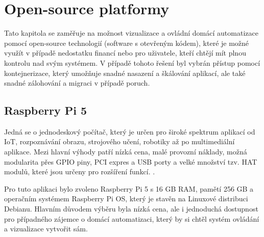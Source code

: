 \chapter{Open-source platformy}
Tato kapitola se zaměřuje na možnost vizualizace a ovládní domácí automatizace pomocí open-source technologií (software s otevřeným kódem), které je možné využít v případě nedostatku financí nebo pro uživatele, kteří chtějí mít plnou kontrolu nad svým systémem. V případě tohoto řešení byl vybrán přístup pomocí kontejnerizace, který umožňuje snadné nasazení a škálování aplikací, ale také snadné zálohování a migraci v případě poruch.

\section{Raspberry Pi 5}
Jedná se o jednodeskový počítač, který je určen pro široké spektrum aplikací od IoT, rozpoznávání obrazu, strojového učení, robotiky až po multimediální aplikace. Mezi hlavní výhody patří nízká cena, malé provozní náklady, možná modularita přes GPIO piny, PCI expres a USB porty a velké množství tzv. HAT modulů, které jsou určeny pro rozšíření funkcí. \cite{Raspberry Pi 5}.

Pro tuto aplikaci bylo zvoleno Raspberry Pi 5 s 16 GB RAM, pamětí 256 GB a operačním systémem Raspberry Pi OS, který je stavěn na Linuxové distribuci Debianu. Hlavním důvodem výběru byla nízká cena, ale i jednoduchá dostupnost pro případného zájemce o domácí automatizaci, který by si chtěl systém ovládání a vizualizace vytvořit sám.

